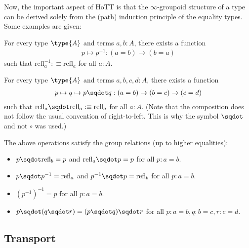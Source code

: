     Now, the important aspect of HoTT is that the $\infty$-groupoid structure of a type can be derived solely from the (path) induction principle of the equality types. Some examples are given:
    \begin{property}[Inversion]
        For every type $\type{A}$ and terms $a,b:A$, there exists a function
        \begin{gather}
            p\mapsto p^{-1}:(a=b)\rightarrow(b=a)
        \end{gather}
        such that $\text{refl}_a^{-1}:\equiv\text{refl}_a$ for all $a:A$.
    \end{property}
    \begin{property}[Concatenation]
        For every type $\type{A}$ and terms $a,b,c,d:A$, there exists a function
        \begin{gather}
            p\mapsto q\mapsto p\sqdot q:(a=b)\rightarrow(b=c)\rightarrow(c=d)
        \end{gather}
        such that $\text{refl}_a\sqdot\text{refl}_a:\equiv\text{refl}_a$ for all $a:A$. (Note that the composition does not follow the usual convention of right-to-left. This is why the symbol $\sqdot$ and not $\circ$ was used.)
    \end{property}
    \begin{property}
        The above operations satisfy the group relations (up to higher equalities):
        \begin{itemize}
            \item $p\sqdot\text{refl}_b=p$ and $\text{refl}_a\sqdot p=p$ for all $p:a=b$.
            \item $p\sqdot p^{-1}=\text{refl}_a$ and $p^{-1}\sqdot p=\text{refl}_b$ for all $p:a=b$.
            \item $(p^{-1})^{-1}=p$ for all $p:a=b$.
            \item $p\sqdot(q\sqdot r) = (p\sqdot q)\sqdot r$ for all $p:a=b, q:b=c, r:c=d$.
        \end{itemize}
    \end{property}

\subsection{Transport}

